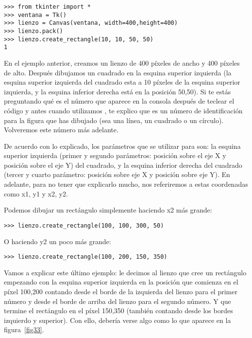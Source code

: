 \begin{listingignore}
\begin{verbatim}
>>> from tkinter import *
>>> ventana = Tk()
>>> lienzo = Canvas(ventana, width=400,height=400)
>>> lienzo.pack()
>>> lienzo.create_rectangle(10, 10, 50, 50)
1
\end{verbatim}
\end{listingignore}

En el ejemplo anterior, creamos un lienzo de 400 píxeles de ancho y 400 píxeles de alto. Después dibujamos un cuadrado en la esquina superior izquierda (la esquina superior izquierda del cuadrado esta a 10 píxeles de la esquina superior izquierda, y la esquina inferior derecha está en la posición 50,50).  Si te estás preguntando qué es el número que aparece en la consola después de teclear el código  y antes cuando utilizamos , te explico que es un número de identificación para la figura que has dibujado (sea una línea, un cuadrado o un círculo). Volveremos este número más adelante.

De acuerdo con lo explicado, los parámetros que se utilizar para  son: la esquina superior izquierda (primer y segundo parámetros: posición sobre el eje X y posición sobre el eje Y) del cuadrado, y la esquina inferior derecha del cuadrado (tercer y cuarto parámetro: posición sobre eje X y posición sobre eje Y). En adelante, para no tener que explicarlo mucho, nos referiremos a estas coordenadas como x1, y1 y x2, y2. 

Podemos dibujar un rectángulo simplemente haciendo x2 más grande:

\begin{listing}
\begin{verbatim}
>>> lienzo.create_rectangle(100, 100, 300, 50)
\end{verbatim}
\end{listing}

\noindent
O haciendo y2 un poco más grande:

\begin{listing}
\begin{verbatim}
>>> lienzo.create_rectangle(100, 200, 150, 350)
\end{verbatim}
\end{listing}

Vamos a explicar este último ejemplo: le decimos al lienzo que cree un rectángulo empezando con la esquina superior izquierda en la posición que comienza en el píxel 100,200 contando desde el borde de la izquierda del lienzo para el primer número y desde el borde de arriba del lienzo para el segundo número. Y que termine el rectángulo en el píxel 150,350 (también contando desde los bordes izquierdo y superior).  Con ello, debería verse algo como lo que aparece en la figura~\ref{fig33}.

